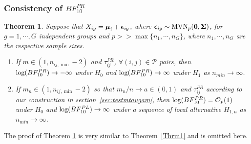 \documentclass[times,sort&compress,3p]{elsarticle}
\theoremstyle{plain}%
\newtheorem{theorem}{Theorem}
\theoremstyle{definition}
\def\bzero{{\mathbf 0}}
\def\log{\hbox{log}}
\def\MVN{\hbox{MVN}}
\def\log{\hbox{log}}
\def\bzero{{\mathbf 0}}
\newcommand{\uepsilon}          {\mbox{\boldmath$\epsilon$}}
\newcommand{\umu}               {\mbox{\boldmath$\mu$}}
\newcommand{\uSigma}            {\mbox{\boldmath$\Sigma$}}
\begin{document}
\subsubsection{Consistency of $BF_{10}^{PR}$}
\begin{theorem}\label{Thrm2}
Suppose that $X_{ig} = \umu_i + \uepsilon_{ig}$, where $\uepsilon_{ig} \sim \MVN_{p}(\bzero, \uSigma)$, for $g = 1, \cdots, G$ independent groups and $p >> \max\{n_1, \cdots, n_{G}\}$, where $n_1, \cdots, n_{G}$ are the respective sample sizes. %
\begin{enumerate}
    \item If $m \in (1,  n_{ij,\min} - 2)$ and $\tau^{PR}_{ij}$, $\forall (i,j) \in \mathcal{P}$ pairs, then $\log(BF^{PR}_{10}) \rightarrow -\infty$ under $H_0$ and $\log(BF^{PR}_{10}) \rightarrow \infty$ under $H_1$ as $n_{min} \rightarrow \infty$. 
    \item If $m_n \in (1,  n_{ij,\min} -2)$ so that $m_n/n \rightarrow a \in (0, 1)$ and $\tau^{PR}_{ij}$ according to our construction in section~\ref{sec:testmtaugam}, then $\log(BF^{PR}_{10}) = \mathcal{O}_{p}(1)$ under $H_0$ and $\log(BF^{PL}_{10}) \rightarrow \infty$ under a sequence of local alternative $H_{1,n}$ as $n_{min} \rightarrow \infty$.
\end{enumerate}
\end{theorem}
The proof of Theorem \ref{Thrm2} is very similar to Theorem~\ref{Thrm1} and is omitted here. 
\end{document}
